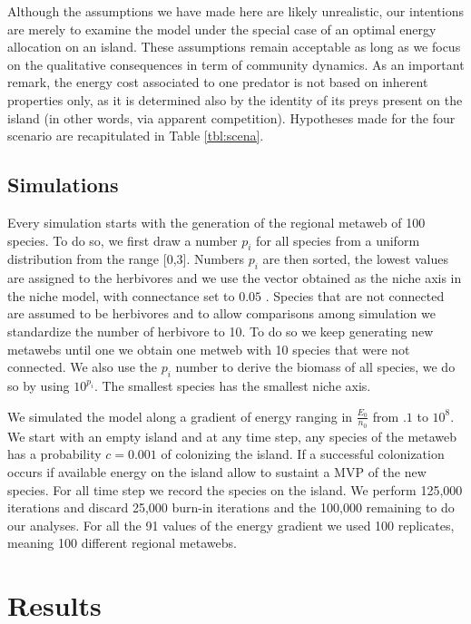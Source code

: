 Although the assumptions we have made here are likely unrealistic, our
intentions are merely to examine the model under the special case of an
optimal energy allocation on an island. These assumptions remain
acceptable as long as we focus on the qualitative consequences in term
of community dynamics. As an important remark, the energy cost
associated to one predator is not based on inherent properties only, as
it is determined also by the identity of its preys present on the island
(in other words, via apparent competition). Hypotheses made for the four
scenario are recapitulated in Table \ref{tbl:scena}.

\subsection{Simulations}\label{simulations}

Every simulation starts with the generation of the regional metaweb of
100 species. To do so, we first draw a number \(p_i\) for all species
from a uniform distribution from the range {[}0,3{]}. Numbers \(p_i\)
are then sorted, the lowest values are assigned to the herbivores and we
use the vector obtained as the niche axis in the niche model, with
connectance set to \(0.05\) \citep{Williams2000}. Species that are not
connected are assumed to be herbivores and to allow comparisons among
simulation we standardize the number of herbivore to 10. To do so we
keep generating new metawebs until one we obtain one metweb with 10
species that were not connected. We also use the \(p_i\) number to
derive the biomass of all species, we do so by using \(10^{p_i}\). The
smallest species has the smallest niche axis.

We simulated the model along a gradient of energy ranging in
\(\frac{E_0}{n_0}\) from \(.1\) to \(10^8\). We start with an empty
island and at any time step, any species of the metaweb has a
probability \(c=0.001\) of colonizing the island. If a successful
colonization occurs if available energy on the island allow to sustaint
a MVP of the new species. For all time step we record the species on the
island. We perform 125,000 iterations and discard 25,000 burn-in
iterations and the 100,000 remaining to do our analyses. For all the 91
values of the energy gradient we used 100 replicates, meaning 100
different regional metawebs.

\section{Results}\label{results}

